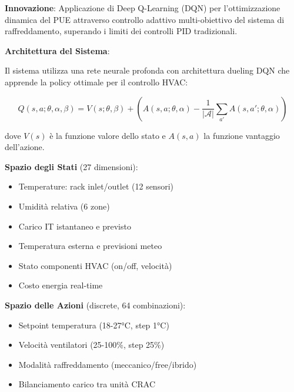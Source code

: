 \begin{tcolorbox}[
    colback=green!5!white,
    colframe=green!65!black,
    title={\textbf{Innovation Box 3.3:} Ottimizzazione Energetica con Deep Reinforcement Learning},
    fonttitle=\bfseries,
    boxrule=1.5pt,
    arc=2mm,
    breakable
]

\textbf{Innovazione}: Applicazione di Deep Q-Learning (DQN) per l'ottimizzazione dinamica del PUE attraverso controllo adattivo multi-obiettivo del sistema di raffreddamento, superando i limiti dei controlli PID tradizionali.

\vspace{0.3cm}
\textbf{Architettura del Sistema}:

Il sistema utilizza una rete neurale profonda con architettura dueling DQN che apprende la policy ottimale per il controllo HVAC:

\begin{equation*}
Q(s,a; \theta, \alpha, \beta) = V(s; \theta, \beta) + \left(A(s,a; \theta, \alpha) - \frac{1}{|\mathcal{A}|}\sum_{a'} A(s,a'; \theta, \alpha)\right)
\end{equation*}

dove $V(s)$ è la funzione valore dello stato e $A(s,a)$ la funzione vantaggio dell'azione.

\vspace{0.3cm}
\textbf{Spazio degli Stati} (27 dimensioni):
\begin{itemize}
    \item Temperature: rack inlet/outlet (12 sensori)
    \item Umidità relativa (6 zone)
    \item Carico IT istantaneo e previsto
    \item Temperatura esterna e previsioni meteo
    \item Stato componenti HVAC (on/off, velocità)
    \item Costo energia real-time
\end{itemize}

\vspace{0.3cm}
\textbf{Spazio delle Azioni} (discrete, 64 combinazioni):
\begin{itemize}
    \item Setpoint temperatura (18-27°C, step 1°C)
    \item Velocità ventilatori (25-100\%, step 25\%)
    \item Modalità raffreddamento (meccanico/free/ibrido)
    \item Bilanciamento carico tra unità CRAC
\end{itemize}


\end{tcolorbox}
